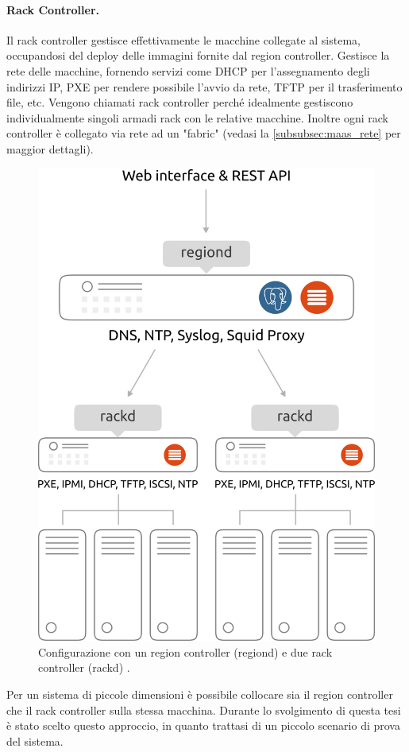 \paragraph{Rack Controller.}
 Il rack controller gestisce effettivamente le macchine collegate al sistema, occupandosi del deploy delle immagini fornite dal region controller.
Gestisce la rete delle macchine, fornendo servizi come DHCP per l'assegnamento degli indirizzi IP, PXE per rendere possibile l'avvio da rete, TFTP per il trasferimento file, etc.
%
Vengono chiamati rack controller perché idealmente gestiscono individualmente singoli armadi rack con le relative macchine.
% 
Inoltre ogni rack controller è collegato via rete ad un "fabric" (vedasi la \cref{subsubsec:maas_rete} per maggior dettagli).
% 
\begin{figure}[H]
    \centering
    \includegraphics[width=0.45\linewidth]{tesi/files/immagini/maas/controllers}
    \caption{Configurazione con un region controller (regiond) e due rack controller (rackd) \cite{maas_how_it_works}.}
    \label{fig:maas_controllers}
\end{figure}

\noindent
Per un sistema di piccole dimensioni è possibile collocare sia il region controller che il rack controller sulla stessa macchina.\label{ref:region+rack}
%
Durante lo svolgimento di questa tesi è stato scelto questo approccio, in quanto trattasi di un piccolo scenario di prova del sistema.



